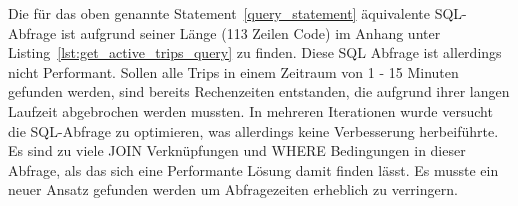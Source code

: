   Die für das oben genannte Statement~\ref{query_statement} äquivalente SQL-Abfrage ist aufgrund seiner Länge (113 Zeilen Code) im Anhang unter Listing~\ref{lst:get_active_trips_query} zu finden. Diese SQL Abfrage ist allerdings nicht Performant. Sollen alle Trips in einem Zeitraum von 1 - 15 Minuten gefunden werden, sind bereits Rechenzeiten entstanden, die aufgrund ihrer langen Laufzeit abgebrochen werden mussten. In mehreren Iterationen wurde versucht die SQL-Abfrage zu optimieren, was allerdings keine Verbesserung herbeiführte. Es sind zu viele JOIN Verknüpfungen und WHERE Bedingungen in dieser Abfrage, als das sich eine Performante Lösung damit finden lässt. Es musste ein neuer Ansatz gefunden werden um Abfragezeiten erheblich zu verringern.

